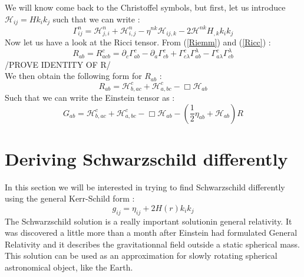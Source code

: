 \documentclass[a4paper,12pt]{article}
\theoremstyle{definition}
\begin{document}
We will know come back to the Christoffel symbols, but first, let us introduce $\mathcal{H}_{ij}=Hk_ik_j$ such that we can write :
\begin{equation}
	\Gamma^n_{ij}=\mathcal{H}^n_{j,i}+\mathcal{H}^n_{i,j}-\eta^{nk}\mathcal{H}_{ij,k}-2\mathcal{H}^{nk}H_{,k}k_ik_j
\end{equation}
Now let us have a look at the Ricci tensor. From (\ref{Riemm}) and (\ref{Ricc}) :
\begin{equation}
	R_{ab}=R^c_{acb}=\partial_c\Gamma^c_{ab}-\partial_a\Gamma^c_{cb}+\Gamma^c_{c\lambda}\Gamma^\lambda_{ab}-\Gamma^c_{a\lambda}\Gamma^\lambda_{cb}
\end{equation}
/PROVE IDENTITY OF R/\\
We then obtain the following form for $R_{ab}$ :
\begin{equation}
	R_{ab}=\mathcal{H}^c_{b,ac}+\mathcal{H}^c_{a,bc}-\Box\mathcal{H}_{ab}
\end{equation}
Such that we can write the Einstein tensor as :
\begin{equation}
	G_{ab}=\mathcal{H}^c_{b,ac}+\mathcal{H}^c_{a,bc}-\Box\mathcal{H}_{ab}-(\frac{1}{2}\eta_{ab}+\mathcal{H}_{ab})R
\end{equation}

\section{Deriving Schwarzschild differently}
In this section we will be interested in trying to find Schwarzschild differently using the general Kerr-Schild form :
\begin{equation}
	g_{ij}=\eta_{ij}+2H(r)k_ik_j
\end{equation}
The Schwarzschild solution is a really important solutionin general relativity. It was discovered a little more than a month after Einstein had formulated General Relativity and it describes the gravitationnal field outside a static spherical mass.
This solution can be used as an approximation for slowly rotating spherical astronomical object, like the Earth.
\end{document}

